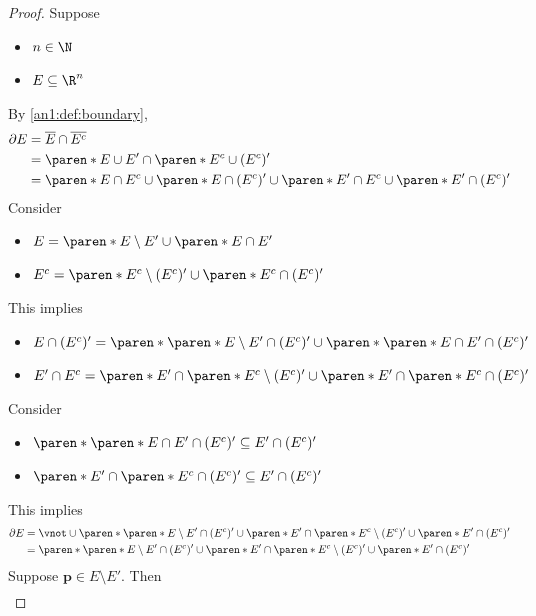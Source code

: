 \begin{proof}
  Suppose
  \begin{itemize}
    \item $n \in \N$
    \item $E \subseteq \R^{n}$
  \end{itemize}
  By \cref{an1:def:boundary},
  \begin{align*}
    \partial E & = \overline{E} \cap \overline{E^{c}}                   \\
               & = \paren*{E \cup E'} \cap \paren*{E^{c} \cup (E^{c})'} \\
               & = \paren*{E \cap E^{c}} \cup \paren*{E \cap (E^{c})'}
    \cup \paren*{E' \cap E^{c}} \cup \paren*{E' \cap (E^{c})'}
  \end{align*}
  Consider
  \begin{itemize}
    \item $E = \paren*{E \setminus E'} \cup \paren*{E \cap E'}$
    \item $E^{c} = \paren*{E^{c} \setminus (E^{c})'} \cup \paren*{E^{c} \cap (E^{c})'}$
  \end{itemize}
  This implies
  \begin{itemize}
    \item $E \cap (E^{c})' = \paren*{\paren*{E \setminus E'} \cap (E^{c})'}
            \cup \paren*{\paren*{E \cap E'} \cap (E^{c})'}$
    \item $E' \cap E^{c} = \paren*{E' \cap \paren*{E^{c} \setminus (E^{c})'}}
            \cup \paren*{E' \cap \paren*{E^{c} \cap (E^{c})'}}$
  \end{itemize}
  Consider
  \begin{itemize}
    \item $\paren*{\paren*{E \cap E'} \cap (E^{c})'} \subseteq E' \cap (E^{c})'$
    \item $\paren*{E' \cap \paren*{E^{c} \cap (E^{c})'}} \subseteq E' \cap (E^{c})'$
  \end{itemize}
  This implies
  \begin{align*}
    \partial E & = \vnot \cup \paren*{\paren*{E \setminus E'} \cap (E^{c})'}
    \cup \paren*{E' \cap \paren*{E^{c} \setminus (E^{c})'}} \cup \paren*{E' \cap (E^{c})'} \\
               & = \paren*{\paren*{E \setminus E'} \cap (E^{c})'}
    \cup \paren*{E' \cap \paren*{E^{c} \setminus (E^{c})'}} \cup \paren*{E' \cap (E^{c})'}
  \end{align*}
  Suppose $\bm{p} \in E \setminus E'$. Then
  \[
    \begin{array}{c}

\end{array}\]
\end{proof}
